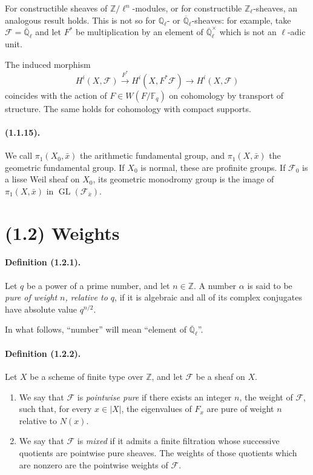 \documentclass[11pt]{article}
\theoremstyle{remark}
\newcommand{\Ql}{\mathbb{Q}_\ell}
\newcommand{\Qlb}{\overline{\mathbb{Q}}_\ell}
\newcommand{\Zl}{\mathbb{Z}_\ell}
\newcommand{\ZZ}{\mathbb{Z}}
\newcommand{\Fq}{\mathbb{F}_q}
\newcommand{\GL}{\operatorname{GL}}
\begin{document}
For constructible sheaves of $\mathbb Z/\ell^n$-modules, or for constructible $\Zl$-sheaves, an analogous result holds. This is not so for $\Ql$- or $\Qlb$-sheaves: for example, take $\mathcal F=\Qlb$ and let $F^*$ be multiplication by an element of $\Qlb^\times$ which is not an $\ell$-adic unit.

The induced morphism
\[
H^i(X,\mathcal F)\xrightarrow{F^*}H^i(X,F^*\mathcal F)\to H^i(X,\mathcal F)
\]
coincides with the action of $F\in W(F/\Fq)$ on cohomology by transport of structure. The same holds for cohomology with compact supports.

\paragraph{(1.1.15).} We call $\pi_1(X_0,\bar x)$ the arithmetic fundamental group, and $\pi_1(X,\bar x)$ the geometric fundamental group. If $X_0$ is normal, these are profinite groups. If $\mathcal F_0$ is a lisse Weil sheaf on $X_0$, its geometric monodromy group is the image of $\pi_1(X,\bar x)$ in $\GL(\mathcal F_{\bar x})$.

\section*{(1.2) Weights}

\paragraph{Definition (1.2.1).} Let $q$ be a power of a prime number, and let $n\in\ZZ$. A number $\alpha$ is said to be \emph{pure of weight $n$, relative to $q$}, if it is algebraic and all of its complex conjugates have absolute value $q^{n/2}$.

In what follows, ``number'' will mean ``element of $\Qlb$''.

\paragraph{Definition (1.2.2).} Let $X$ be a scheme of finite type over $\ZZ$, and let $\mathcal F$ be a sheaf on $X$.
\begin{enumerate}[label=(\roman*)]
\item We say that $\mathcal F$ is \emph{pointwise pure} if there exists an integer $n$, the weight of $\mathcal F$, such that, for every $x\in |X|$, the eigenvalues of $F_x$ are pure of weight $n$ relative to $N(x)$.
\item We say that $\mathcal F$ is \emph{mixed} if it admits a finite filtration whose successive quotients are pointwise pure sheaves. The weights of those quotients which are nonzero are the pointwise weights of $\mathcal F$.
\end{enumerate}
\end{document}
